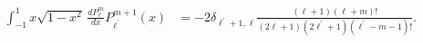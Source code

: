 \begin{align}
    \int_{-1}^{1} x\sqrt{1-x^2} \,\frac{dP_{\ell}^{m}}{dx} P_{\ell^{\prime}}^{m+1} (x) &= -2\delta_{\ell^{\prime}+1,\ell}\frac{(\ell+1)(\ell+m)!}{(2\ell+1)(2\ell^{\prime}+1)(\ell^{\prime}-m-1)!}.
\end{align}
